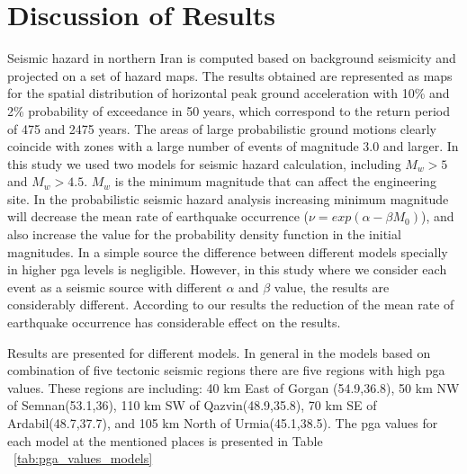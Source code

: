 
\section{Discussion of Results}

Seismic hazard in northern Iran is computed based on background seismicity and projected on a set of hazard maps. The results obtained are represented as maps for the spatial distribution of horizontal peak ground acceleration with 10\% and 2\% probability of exceedance in 50 years, which correspond to the return period of 475 and 2475 years. The areas of large probabilistic ground motions clearly coincide with zones with a large number of events of magnitude 3.0 and larger. In this study we used two models for seismic hazard calculation, including $M_w>5$ and $M_w>4.5$. $M_w$ is the minimum magnitude that can affect the engineering site. In the probabilistic seismic hazard analysis increasing minimum magnitude will decrease the mean rate of earthquake occurrence ($\nu=exp(\alpha - \beta M_0)$), and also increase the value for the probability density function in the initial magnitudes. In a simple source the difference between different models specially in higher pga levels is negligible. However, in this study where we consider each event as a seismic source with different $\alpha$ and $\beta$ value, the results are considerably different. According to our results the reduction of the mean rate of earthquake occurrence has considerable effect on the results. 

\noindent
Results are presented for different models. In general in the models based on combination of five tectonic seismic regions there are five regions with high pga values. These regions are including: 40 km East of Gorgan (54.9,36.8), 50 km NW of Semnan(53.1,36), 110 km SW of Qazvin(48.9,35.8), 70 km SE of Ardabil(48.7,37.7), and 105 km North of Urmia(45.1,38.5). The pga values for each model at the mentioned places is presented in Table ~\ref{tab:pga_values_models}


